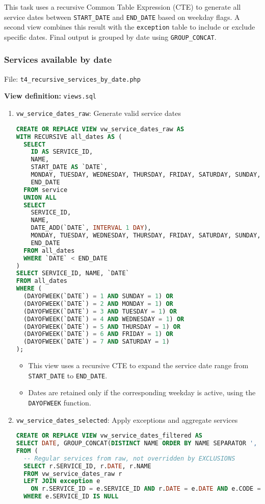 \documentclass[a4paper, 12pt]{article}
\begin{document}
This task uses a recursive Common Table Expression (CTE) to generate all service dates between \texttt{START\_DATE} and \texttt{END\_DATE} based on weekday flags. A second view combines this result with the \texttt{exception} table to include or exclude specific dates. Final output is grouped by date using \texttt{GROUP\_CONCAT}.

\subsubsection{Services available by date}

File: \texttt{t4\_recursive\_services\_by\_date.php}

\textbf{View definition:} \texttt{views.sql}

\begin{enumerate}
    \item \texttt{vw\_service\_dates\_raw}: Generate valid service dates 

    \begin{lstlisting}[language=SQL]
CREATE OR REPLACE VIEW vw_service_dates_raw AS
WITH RECURSIVE all_dates AS (
  SELECT 
    ID AS SERVICE_ID,
    NAME,
    START_DATE AS `DATE`,
    MONDAY, TUESDAY, WEDNESDAY, THURSDAY, FRIDAY, SATURDAY, SUNDAY,
    END_DATE
  FROM service
  UNION ALL
  SELECT
    SERVICE_ID,
    NAME,
    DATE_ADD(`DATE`, INTERVAL 1 DAY),
    MONDAY, TUESDAY, WEDNESDAY, THURSDAY, FRIDAY, SATURDAY, SUNDAY,
    END_DATE
  FROM all_dates
  WHERE `DATE` < END_DATE
)
SELECT SERVICE_ID, NAME, `DATE`
FROM all_dates
WHERE (
  (DAYOFWEEK(`DATE`) = 1 AND SUNDAY = 1) OR
  (DAYOFWEEK(`DATE`) = 2 AND MONDAY = 1) OR
  (DAYOFWEEK(`DATE`) = 3 AND TUESDAY = 1) OR
  (DAYOFWEEK(`DATE`) = 4 AND WEDNESDAY = 1) OR
  (DAYOFWEEK(`DATE`) = 5 AND THURSDAY = 1) OR
  (DAYOFWEEK(`DATE`) = 6 AND FRIDAY = 1) OR
  (DAYOFWEEK(`DATE`) = 7 AND SATURDAY = 1)
);
    \end{lstlisting}
    \begin{itemize}
        \item This view uses a recursive CTE to expand the service date range from \texttt{START\_DATE} to \texttt{END\_DATE}.
        \item Dates are retained only if the corresponding weekday is active, using the \texttt{DAYOFWEEK} function.
    \end{itemize}
    \item \texttt{vw\_service\_dates\_selected}: Apply exceptions and aggregate services
    \begin{lstlisting}[language=SQL]
CREATE OR REPLACE VIEW vw_service_dates_filtered AS
SELECT DATE, GROUP_CONCAT(DISTINCT NAME ORDER BY NAME SEPARATOR ', ') AS SERVICES
FROM (
  -- Regular services from raw, not overridden by EXCLUSIONS
  SELECT r.SERVICE_ID, r.DATE, r.NAME
  FROM vw_service_dates_raw r
  LEFT JOIN exception e
    ON r.SERVICE_ID = e.SERVICE_ID AND r.DATE = e.DATE AND e.CODE = 2
  WHERE e.SERVICE_ID IS NULL


\end{lstlisting}
\end{enumerate}
\end{document}

